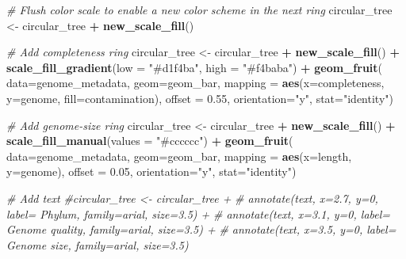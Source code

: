 \documentclass[
]{book}
\newenvironment{Shaded}{\begin{snugshade}}{\end{snugshade}}
\newcommand{\AttributeTok}[1]{\textcolor[rgb]{0.13,0.29,0.53}{#1}}
\newcommand{\CommentTok}[1]{\textcolor[rgb]{0.56,0.35,0.01}{\textit{#1}}}
\newcommand{\FloatTok}[1]{\textcolor[rgb]{0.00,0.00,0.81}{#1}}
\newcommand{\FunctionTok}[1]{\textcolor[rgb]{0.13,0.29,0.53}{\textbf{#1}}}
\newcommand{\NormalTok}[1]{#1}
\newcommand{\OtherTok}[1]{\textcolor[rgb]{0.56,0.35,0.01}{#1}}
\newcommand{\SpecialCharTok}[1]{\textcolor[rgb]{0.81,0.36,0.00}{\textbf{#1}}}
\newcommand{\StringTok}[1]{\textcolor[rgb]{0.31,0.60,0.02}{#1}}
\begin{document}
\begin{Shaded}
\begin{Highlighting}[]
\CommentTok{\# Flush color scale to enable a new color scheme in the next ring}
\NormalTok{circular\_tree }\OtherTok{\textless{}{-}}\NormalTok{ circular\_tree }\SpecialCharTok{+} \FunctionTok{new\_scale\_fill}\NormalTok{()}

\CommentTok{\# Add completeness ring}
\NormalTok{circular\_tree }\OtherTok{\textless{}{-}}\NormalTok{ circular\_tree }\SpecialCharTok{+}
        \FunctionTok{new\_scale\_fill}\NormalTok{() }\SpecialCharTok{+}
        \FunctionTok{scale\_fill\_gradient}\NormalTok{(}\AttributeTok{low =} \StringTok{"\#d1f4ba"}\NormalTok{, }\AttributeTok{high =} \StringTok{"\#f4baba"}\NormalTok{) }\SpecialCharTok{+}
        \FunctionTok{geom\_fruit}\NormalTok{(}
                \AttributeTok{data=}\NormalTok{genome\_metadata,}
                \AttributeTok{geom=}\NormalTok{geom\_bar,}
                \AttributeTok{mapping =} \FunctionTok{aes}\NormalTok{(}\AttributeTok{x=}\NormalTok{completeness, }\AttributeTok{y=}\NormalTok{genome, }\AttributeTok{fill=}\NormalTok{contamination),}
                \AttributeTok{offset =} \FloatTok{0.55}\NormalTok{,}
                \AttributeTok{orientation=}\StringTok{"y"}\NormalTok{,}
              \AttributeTok{stat=}\StringTok{"identity"}\NormalTok{)}

\CommentTok{\# Add genome{-}size ring}
\NormalTok{circular\_tree }\OtherTok{\textless{}{-}}\NormalTok{  circular\_tree }\SpecialCharTok{+}
        \FunctionTok{new\_scale\_fill}\NormalTok{() }\SpecialCharTok{+}
        \FunctionTok{scale\_fill\_manual}\NormalTok{(}\AttributeTok{values =} \StringTok{"\#cccccc"}\NormalTok{) }\SpecialCharTok{+}
        \FunctionTok{geom\_fruit}\NormalTok{(}
             \AttributeTok{data=}\NormalTok{genome\_metadata,}
             \AttributeTok{geom=}\NormalTok{geom\_bar,}
             \AttributeTok{mapping =} \FunctionTok{aes}\NormalTok{(}\AttributeTok{x=}\NormalTok{length, }\AttributeTok{y=}\NormalTok{genome),}
                 \AttributeTok{offset =} \FloatTok{0.05}\NormalTok{,}
                 \AttributeTok{orientation=}\StringTok{"y"}\NormalTok{,}
         \AttributeTok{stat=}\StringTok{"identity"}\NormalTok{)}

\CommentTok{\# Add text}
\CommentTok{\#circular\_tree \textless{}{-}  circular\_tree +}
\CommentTok{\#        annotate(\textquotesingle{}text\textquotesingle{}, x=2.7, y=0, label=\textquotesingle{}            Phylum\textquotesingle{}, family=\textquotesingle{}arial\textquotesingle{}, size=3.5) +}
\CommentTok{\#        annotate(\textquotesingle{}text\textquotesingle{}, x=3.1, y=0, label=\textquotesingle{}                         Genome quality\textquotesingle{}, family=\textquotesingle{}arial\textquotesingle{}, size=3.5) +}
\CommentTok{\#        annotate(\textquotesingle{}text\textquotesingle{}, x=3.5, y=0, label=\textquotesingle{}                     Genome size\textquotesingle{}, family=\textquotesingle{}arial\textquotesingle{}, size=3.5)}


\end{Highlighting}
\end{Shaded}
\end{document}
